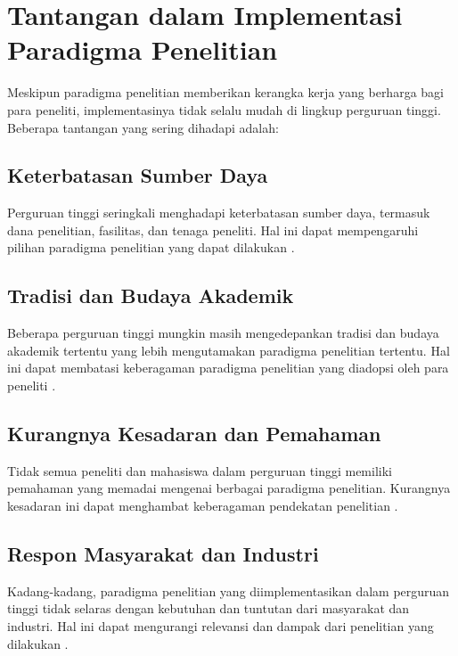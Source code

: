 \section{Tantangan dalam Implementasi Paradigma Penelitian}

Meskipun paradigma penelitian memberikan kerangka kerja yang berharga bagi para peneliti, implementasinya tidak selalu mudah di lingkup perguruan tinggi. Beberapa tantangan yang sering dihadapi adalah:

\subsection{Keterbatasan Sumber Daya}
Perguruan tinggi seringkali menghadapi keterbatasan sumber daya, termasuk dana penelitian, fasilitas, dan tenaga peneliti. Hal ini dapat mempengaruhi pilihan paradigma penelitian yang dapat dilakukan \cite{salkind2007encyclopedia}.

\subsection{Tradisi dan Budaya Akademik}
Beberapa perguruan tinggi mungkin masih mengedepankan tradisi dan budaya akademik tertentu yang lebih mengutamakan paradigma penelitian tertentu. Hal ini dapat membatasi keberagaman paradigma penelitian yang diadopsi oleh para peneliti \cite{ritzer2004handbook}.

\subsection{Kurangnya Kesadaran dan Pemahaman}
Tidak semua peneliti dan mahasiswa dalam perguruan tinggi memiliki pemahaman yang memadai mengenai berbagai paradigma penelitian. Kurangnya kesadaran ini dapat menghambat keberagaman pendekatan penelitian \cite{smith1983quantitative}.

\subsection{Respon Masyarakat dan Industri}
Kadang-kadang, paradigma penelitian yang diimplementasikan dalam perguruan tinggi tidak selaras dengan kebutuhan dan tuntutan dari masyarakat dan industri. Hal ini dapat mengurangi relevansi dan dampak dari penelitian yang dilakukan \cite{salkind2007encyclopedia}.
